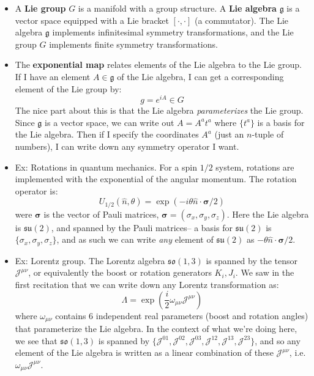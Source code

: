 \documentclass[12pt, oneside]{article}   	%
\theoremstyle{definition}
\begin{document}
\begin{itemize}
	
	\item A \textbf{Lie group} $G$ is a manifold with a group structure. A \textbf{Lie algebra} $\mathfrak g$ is a vector space equipped with a Lie bracket $[\cdot, \cdot]$ (a commutator). The Lie algebra $\mathfrak g$ implements infinitesimal symmetry transformations, and the Lie group $G$ implements finite symmetry transformations. 
	
	\item The \textbf{exponential map} relates elements of the Lie algebra to the Lie group. If I have an element $A\in \mathfrak g$ of the Lie algebra, I can get a corresponding element of the Lie group by:
	\begin{equation}
		g = e^{iA}\in G\label{eq:lie_group_expansion}
	\end{equation}
	The nice part about this is that the Lie algebra \textit{parameterizes} the Lie group. Since $\mathfrak g$ is a vector space, we can write out $A = A^a t^a$ where $\{t^a\}$ is a basis for the Lie algebra. Then if I specify the coordinates $A^a$ (just an $n$-tuple of numbers), I can write down any symmetry operator I want. 
	
	\item Ex: Rotations in quantum mechanics. For a spin $1/2$ system, rotations are implemented with the exponential of the angular momentum. The rotation operator is:
	\begin{equation}
		U_{1/2}(\hat n, \theta) = \exp(-i\theta\hat n\cdot \bm \sigma / 2)
	\end{equation}
	were $\bm \sigma$ is the vector of Pauli matrices, $\bm \sigma = (\sigma_x, \sigma_y, \sigma_z)$. Here the Lie algebra is $\mathfrak{su}(2)$, and spanned by the Pauli matrices-- a basis for $\mathfrak{su}(2)$ is $\{\sigma_x, \sigma_y, \sigma_z\}$, and as such we can write \textit{any} element of $\mathfrak{su}(2)$ as $-\theta \hat n\cdot \bm \sigma / 2$. 
	
	\item Ex: Lorentz group. The Lorentz algebra $\mathfrak{so}(1, 3)$ is spanned by the tensor $\mathcal J^{\mu\nu}$, or equivalently the boost or rotation generators $K_i, J_i$. We saw in the first recitation that we can write down any Lorentz transformation as:
	\begin{equation}
		\Lambda = \exp\left(\frac{i}{2}\omega_{\mu\nu} \mathcal J^{\mu\nu}\right)
	\end{equation}
	where $\omega_{\mu\nu}$ contains 6 independent real parameters (boost and rotation angles) that parameterize the Lie algebra. In the context of what we're doing here, we see that $\mathfrak{so}(1, 3)$ is spanned by $\{\mathcal J^{01}, \mathcal J^{02}, \mathcal J^{03}, \mathcal J^{12}, \mathcal J^{13}, \mathcal J^{23}\}$, and so any element of the Lie algebra is written as a linear combination of these $\mathcal J^{\mu\nu}$, i.e. $\omega_{\mu\nu} \mathcal J^{\mu\nu}$. 
	

\end{itemize}
\end{document}
